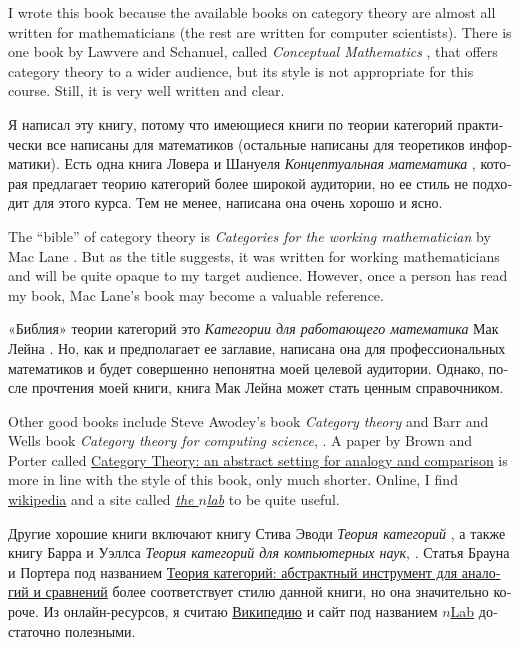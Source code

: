 \documentclass[a4paper]{book}
\theoremstyle{myth}
\begin{document}
\begin{russian}
I wrote this book because the available books on category theory are almost all written for mathematicians (the rest are written for computer scientists). There is one book by Lawvere and Schanuel, called {\em Conceptual Mathematics} \cite{LS}, that offers category theory to a wider audience, but its style is not appropriate for this course. Still, it is very well written and clear.

Я написал эту книгу, потому что имеющиеся книги по теории категорий практически все написаны для математиков (остальные написаны для теоретиков информатики). Есть одна книга Ловера и Шануеля {\em Концептуальная математика} \cite{LS}, которая предлагает теорию категорий более широкой аудитории, но ее стиль не подходит для этого курса. Тем не менее, написана она очень хорошо и ясно. 

The “bible” of category theory is {\em Categories for the working mathematician} by Mac Lane \cite{Mac}. But as the title suggests, it was written for working mathematicians and will be quite opaque to my target audience. However, once a person has read my book, Mac Lane's book may become a valuable reference.

«Библия» теории категорий это {\em Категории для работающего математика} Мак Лейна \cite{Mac}. Но, как и предполагает ее заглавие, написана она для профессиональных математиков и будет совершенно непонятна моей целевой аудитории. Однако, после прочтения моей книги, книга Мак Лейна может стать ценным справочником.  

Other good books include Steve Awodey's book {\em Category theory} \cite{Awo} and Barr and Wells book {\em Category theory for computing science}, \cite{BW}.  A paper by Brown and Porter called  \href{http://pages.bangor.ac.uk/\%7Emas010/pdffiles/Analogy-and-Comparison.pdf}{\text Category Theory: an abstract setting for analogy and comparison} \cite{BP1} is more in line with the style of this book, only much shorter. Online, I find \href{http://www.wikipedia.org}{\text wikipedia} and a site called \href{http://ncatlab.org/nlab/show/HomePage}{\em the $n$lab} to be quite useful.

Другие хорошие книги включают книгу Стива Эводи {\em Теория категорий} \cite{Awo}, а также книгу Барра и Уэллса {\em Теория категорий для компьютерных наук}, \cite{BW}. Статья Брауна и Портера под названием  \href{http://pages.bangor.ac.uk/\%7Emas010/pdffiles/Analogy-and-Comparison.pdf}{\text Теория категорий: абстрактный инструмент для аналогий и сравнений} \cite{BP1} более соответствует стилю данной книги, но она значительно короче. Из онлайн-ресурсов, я считаю \href{http://www.wikipedia.org}{\text Википедию} и сайт под названием \href{http://ncatlab.org/nlab/show/HomePage}{$n$Lab} достаточно полезными. 


\end{russian}
\end{document}
